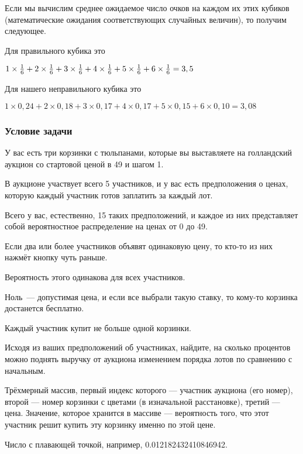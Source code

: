 Если мы вычислим среднее ожидаемое число очков на каждом их этих кубиков (математические ожидания соответствующих случайных величин), то получим следующее.

Для правильного кубика это 

$1 \times { 1 \over 6 } + 2 \times { 1 \over 6 } + 3 \times { 1 \over 6 } + 4 \times { 1 \over 6 }+5  \times { 1 \over 6 } +6 \times { 1 \over 6 } = 3,5$ 

Для нашего неправильного кубика это 

$1 \times 0,24 + 2 \times 0,18 + 3 \times 0,17 + 4 \times 0,17 + 5\times 0,15 + 6\times 0,10 = 3,08$  

\subsubsection*{Условие задачи}

У вас есть три корзинки с тюльпанами, которые вы выставляете на голландский аукцион со стартовой ценой в 49 и шагом 1.

В аукционе участвует всего 5 участников, и у вас есть предположения о ценах, которую каждый участник готов заплатить за каждый лот.

Всего у вас, естественно, 15 таких предположений, и каждое из них представляет собой вероятностное распределение на ценах от 0 до 49.

Если два или более участников объявят одинаковую цену, то кто-то из них нажмёт кнопку чуть раньше.

Вероятность этого одинакова для всех участников.

Ноль~— допустимая цена, и если все выбрали такую ставку, то кому-то корзинка достанется бесплатно.

Каждый участник купит не больше одной корзинки.

Исходя из ваших предположений об участниках, найдите, на сколько процентов можно поднять выручку от аукциона изменением порядка лотов по сравнению с начальным.


Трёхмерный массив, первый индекс которого — участник аукциона (его номер), второй — номер корзинки с цветами (в изначальной расстановке), третий — цена. Значение, которое хранится в массиве — вероятность того, что этот участник решит купить эту корзинку именно по этой цене.

\outputfmtSection

Число с плавающей точкой, например, 0.012182432410846942.

